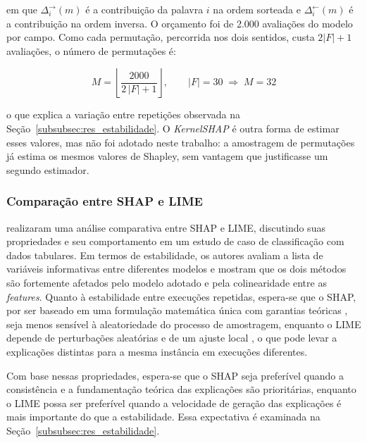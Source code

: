 \documentclass[
    12pt,                %
    openright,           %
    oneside,             %
    a4paper,             %
    english,             %
    brazil               %
]{abntex2}
\begin{document}
em que $\Delta_i^{\rightarrow}(m)$ é a contribuição da palavra $i$ na ordem sorteada e $\Delta_i^{\leftarrow}(m)$ é a contribuição na ordem inversa. O orçamento foi de 2.000 avaliações do modelo por campo. Como cada permutação, percorrida nos dois sentidos, custa $2|F| + 1$ avaliações, o número de permutações é:

\begin{equation}
M = \left\lfloor \frac{2000}{2\,|F| + 1} \right\rfloor, \qquad |F| = 30 \;\Rightarrow\; M = 32
\label{eq:orcamento}
\end{equation}

o que explica a variação entre repetições observada na Seção~\ref{subsubsec:res_estabilidade}. O \textit{KernelSHAP} \cite{lundberg2017} é outra forma de estimar esses valores, mas não foi adotado neste trabalho: a amostragem de permutações já estima os mesmos valores de Shapley, sem vantagem que justificasse um segundo estimador.

\subsubsection{Comparação entre SHAP e LIME}
\label{subsec:shap_lime}

\label{subsubsec:comparacao_consistencia}

 realizaram uma análise comparativa entre SHAP e LIME, discutindo suas propriedades e seu comportamento em um estudo de caso de classificação com dados tabulares. Em termos de estabilidade, os autores avaliam a lista de variáveis informativas entre diferentes modelos e mostram que os dois métodos são fortemente afetados pelo modelo adotado e pela colinearidade entre as \textit{features}. Quanto à estabilidade entre execuções repetidas, espera-se que o SHAP, por ser baseado em uma formulação matemática única com garantias teóricas \cite{lundberg2017}, seja menos sensível à aleatoriedade do processo de amostragem, enquanto o LIME depende de perturbações aleatórias e de um ajuste local \cite{ribeiro2016}, o que pode levar a explicações distintas para a mesma instância em execuções diferentes.

Com base nessas propriedades, espera-se que o SHAP seja preferível quando a consistência e a fundamentação teórica das explicações são prioritárias, enquanto o LIME possa ser preferível quando a velocidade de geração das explicações é mais importante do que a estabilidade. Essa expectativa é examinada na Seção~\ref{subsubsec:res_estabilidade}.
\end{document}
